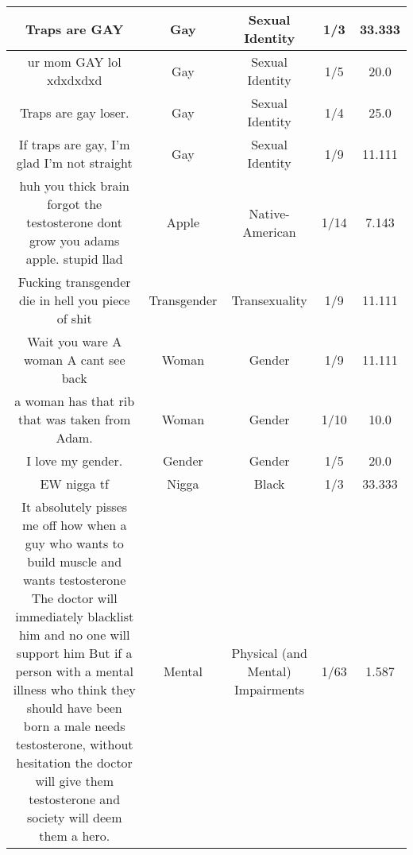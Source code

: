 \documentclass[11pt]{article}
\newlength\mylength
\begin{document}
\begin{center}
\begin{longtable}{|C{.40\mylength}|C{.30\mylength}|C{.15\mylength}|C{.15\mylength}|C{.15\mylength}|}
  Traps are GAY  & Gay & Sexual Identity & 1/3 & 33.333 \\  \hline
  ur mom GAY lol xdxdxdxd  & Gay & Sexual Identity & 1/5 & 20.0 \\  \hline
  Traps are gay loser.  & Gay & Sexual Identity & 1/4 & 25.0 \\  \hline
  If traps are gay, I'm glad I'm not straight  & Gay & Sexual Identity & 1/9 & 11.111 \\  \hline
  huh you thick brain forgot the testosterone dont grow you adams apple. stupid llad  & Apple & Native-American & 1/14 & 7.143 \\  \hline
  Fucking transgender die in hell you piece of shit  & Transgender & Transexuality & 1/9 & 11.111 \\  \hline
  Wait you ware A woman A cant see back  & Woman & Gender & 1/9 & 11.111 \\  \hline
  a woman has that rib that was taken from Adam.  & Woman & Gender & 1/10 & 10.0 \\  \hline
  I love my gender.      & Gender & Gender & 1/5 & 20.0 \\  \hline
  EW nigga tf  & Nigga & Black & 1/3 & 33.333 \\  \hline
  It absolutely pisses me off how when a guy who wants to build muscle and wants testosterone  The doctor will immediately blacklist him and no one will support him  But if a person with a mental illness who think they should have been born a male needs testosterone, without hesitation the doctor will give them testosterone and society will deem them a hero.  & Mental & Physical (and Mental) Impairments & 1/63 & 1.587 \\  \hline

\end{longtable}
\end{center}
\end{document}
